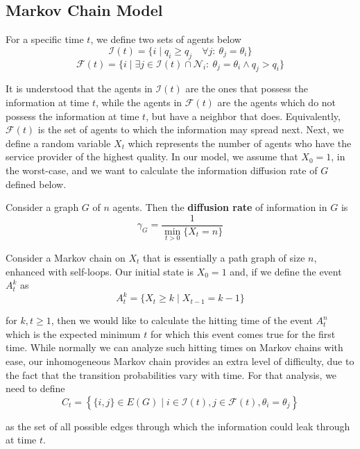 \documentclass[format=acmsmall, review=false]{acmart}
\begin{document}
\subsection{Markov Chain Model}

\par For a specific time $t$, we define two sets of agents below
\[
\mathcal{I}(t) = \{ i \mid q_i \geq q_j \quad \forall j : \: \theta_j = \theta_i \}
\]
\[
\mathcal{F}(t) = \{ i \mid \exists j \in \mathcal{I}(t) \cap \mathcal{N}_i : \: \theta_j = \theta_i \land q_j > q_i \}
\]

\par It is understood that the agents in $\mathcal{I}(t)$ are the ones that possess the information at time $t$, while the agents
in $\mathcal{F}(t)$ are the agents which do not possess the information at time $t$, but have a neighbor that does. Equivalently,
$\mathcal{F}(t)$ is the set of agents to which the information may spread next. Next, we define a random variable $X_t$ which
represents the number of agents who have the service provider of the highest quality. In our model, we assume that $X_0 = 1$,
in the worst-case, and we want to calculate the information diffusion rate of $G$ defined below.

\begin{definition}
Consider a graph $G$ of $n$ agents. Then the \textbf{diffusion rate} of information in $G$ is
\[
\gamma_G = \frac{1}{\min_{t > 0} { \{ X_t = n \} }}
\]
\end{definition}

\par Consider a Markov chain on $X_t$ that is essentially a path graph of size $n$, enhanced with self-loops. Our initial state
is $X_0 = 1$ and, if we define the event $A^k_t$ as
\[
A^k_t = \{ X_t \geq k \mid X_{t-1} = k-1 \}
\]

for $k, t \geq 1$, then we would like to calculate the hitting time of the event $A^n_t$ which is the expected minimum $t$ for
which this event comes true for the first time. While normally we can analyze such hitting times on Markov chains with ease,
our inhomogeneous Markov chain provides an extra level of difficulty, due to the fact that the transition probabilities vary
with time. For that analysis, we need to define
\[
C_t = \left\{ \{ i, j\} \in E(G) \mid i \in \mathcal{I}(t), j \in \mathcal{F}(t), \theta_i = \theta_j \right\}
\]

as the set of all possible edges through which the information could leak through at time $t$.
\end{document}
